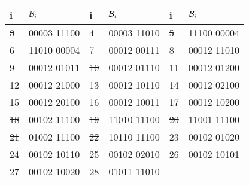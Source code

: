 \begin{tabular}{|l|l||l|l||l|l|}
\hline
 i & $\mathcal{B}_i$  &  i & $\mathcal{B}_i$  &  i & $\mathcal{B}_i$ \\\hline
\hline
\sout{3} &00003 11100 &
{4} &00003 11010 &
\sout{5} &11100 00004 \\
{6} &11010 00004 &
\sout{7} &00012 00111 &
{8} &00012 11010 \\
{9} &00012 01011 &
\sout{10} &00012 01110 &
{11} &00012 01200 \\
{12} &00012 21000 &
{13} &00012 10110 &
{14} &00012 02100 \\
{15} &00012 20100 &
\sout{16} &00012 10011 &
{17} &00012 10200 \\
\sout{18} &00102 11100 &
\sout{19} &11010 11100 &
\sout{20} &11001 11100 \\
\sout{21} &01002 11100 &
\sout{22} &10110 11100 &
{23} &00102 01020 \\
{24} &00102 10110 &
{25} &00102 02010 &
{26} &00102 10101 \\
{27} &00102 10020 &
{28} &01011 11010 &
 & \\\hline
\end{tabular}


